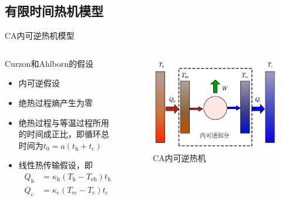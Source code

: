 \documentclass{beamer}
\begin{document}
\subsection{有限时间热机模型}
\begin{frame}{CA内可逆热机模型}
\begin{columns}
    \begin{column}{.62\textwidth}
        \begin{exampleblock}{Curzon和Ahlborn的假设}
            \begin{itemize}
                \item<2-> 内可逆假设
                \item<3-> 绝热过程熵产生为零
                \item<4-> 绝热过程与等温过程所用的时间成正比，即循环总时间为$t_0 = a (t_{\mathrm{h}}+t_{\mathrm{c}})$
                \item<5-> 线性热传输假设，即
                \begin{equation}
                    \begin{split}
                        Q_{\mathrm{h}}&=\kappa_{\mathrm{h}}\left(T_{\mathrm{h}}-T_{\mathrm{eh}}\right) t_{\mathrm{h}}\\
                        Q_{\mathrm{c}}&=\kappa_{\mathrm{c}}\left(T_{\mathrm{ec}}-T_{\mathrm{c}}\right) t_{\mathrm{c}}
                    \end{split} 
                    \label{eq1}
                \end{equation}
            \end{itemize}   
        \end{exampleblock}
    \end{column}

    \begin{column}{.38\textwidth}
        \begin{figure}[!htbp]
            \begin{center}
                \includegraphics[width=\textwidth]{p1.png}
            \end{center}
            \caption{CA内可逆热机}
            \label{f1}
        \end{figure}
    \end{column}
\end{columns}
\end{frame}
\end{document}

